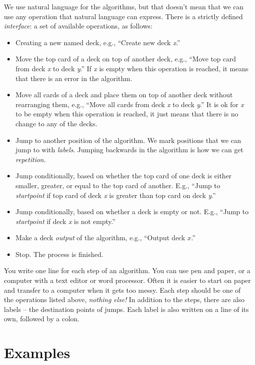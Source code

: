 \documentclass[a4paper,twoside]{tufte-handout}
\begin{document}
We use natural language for the algorithms, but that doesn't
mean that we can use any operation that natural language can
express. There is a strictly defined \emph{interface}: a set of
available operations, as follows:
\begin{itemize}
\item Creating a new named deck, e.g., ``Create new deck \emph{x}.''
\item Move the top card of a deck on top of another deck, e.g., ``Move
  top card from deck \emph{x} to deck \emph{y}.'' If \emph{x} is empty
  when this operation is reached, it means that there is an error in
  the algorithm.
\item Move all cards of a deck and place them on top of another deck
  without rearranging them, e.g., ``Move all cards from deck \emph{x}
  to deck \emph{y}.'' It is ok for \emph{x} to be empty when this
  operation is reached, it just means that there is no change to any
  of the decks.
\item Jump to another position of the algorithm. We mark positions
  that we can jump to with \emph{labels}. Jumping backwards in the
  algorithm is how we can get \emph{repetition}.
\item Jump conditionally, based on whether the top card of one deck is
  either smaller, greater, or equal to the top card of another. E.g.,
  ``Jump to \emph{startpoint} if top card of deck \emph{x} is greater
  than top card on deck \emph{y}.''
\item Jump conditionally, based on whether a deck is empty or not. E.g.,
  ``Jump to \emph{startpoint} if deck \emph{x} is not empty.''
\item Make a deck \emph{output} of the algorithm, e.g., ``Output deck
  $x$.''
\item Stop. The process is finished.
\end{itemize}

You write one line for each step of an algorithm. You can use pen and
paper, or a computer with a text editor or word processor. Often it is
easier to start on paper and transfer to a computer when it gets too
messy. Each step should be one of the operations listed above,
\emph{nothing else!} In addition to the steps, there are also labels
-- the destination points of jumps. Each label is also written on a
line of its own, followed by a colon.

\section{Examples}\label{sec-examp}
\end{document}
